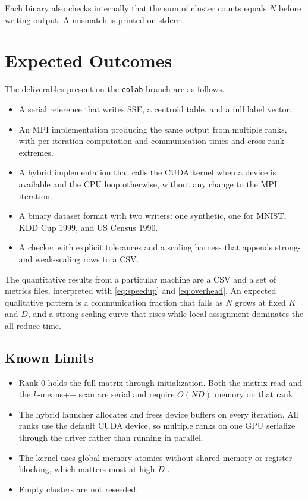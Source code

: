 \documentclass[12pt,a4paper]{article}
\DeclareRobustCommand{\code}[1]{\texttt{#1}}
\begin{document}
Each binary also checks internally that the sum of cluster counts equals $N$ before writing output. A mismatch is printed on stderr.

\section{Expected Outcomes}
\label{sec:outcomes}

The deliverables present on the \code{colab} branch are as follows.

\begin{itemize}
  \item A serial reference that writes SSE, a centroid table, and a full label vector.
  \item An MPI implementation producing the same output from multiple ranks, with per-iteration computation and communication times and cross-rank extremes.
  \item A hybrid implementation that calls the CUDA kernel when a device is available and the CPU loop otherwise, without any change to the MPI iteration.
  \item A binary dataset format with two writers: one synthetic, one for MNIST, KDD Cup 1999, and US Census 1990.
  \item A checker with explicit tolerances and a scaling harness that appends strong- and weak-scaling rows to a CSV.
\end{itemize}

The quantitative results from a particular machine are a CSV and a set of metrics files, interpreted with \eqref{eq:speedup} and \eqref{eq:overhead}. An expected qualitative pattern is a communication fraction that falls as $N$ grows at fixed $K$ and $D$, and a strong-scaling curve that rises while local assignment dominates the all-reduce time.

\subsection{Known Limits}

\begin{itemize}
  \item Rank 0 holds the full matrix through initialization. Both the matrix read and the $k$-means++ scan are serial and require $O(ND)$ memory on that rank.
  \item The hybrid launcher allocates and frees device buffers on every iteration. All ranks use the default CUDA device, so multiple ranks on one GPU serialize through the driver rather than running in parallel.
  \item The kernel uses global-memory atomics without shared-memory or register blocking, which matters most at high $D$ \cite{li2013}.
  \item Empty clusters are not reseeded.
\end{itemize}
\end{document}

